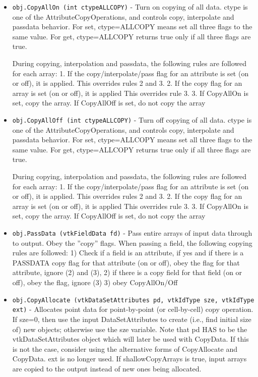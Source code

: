 \begin{itemize}
\item  \verb|obj.CopyAllOn (int ctypeALLCOPY)| -  Turn on copying of all data.
 ctype is one of the AttributeCopyOperations, and controls copy, 
 interpolate and passdata behavior.
 For set, ctype=ALLCOPY means set all three flags to the same value.
 For get, ctype=ALLCOPY returns true only if all three flags are true.

 During copying, interpolation and passdata, the following rules are 
 followed for each array:
 1. If the copy/interpolate/pass flag for an attribute is set (on or off), it is applied.
    This overrides rules 2 and 3.
 2. If the copy flag for an array is set (on or off), it is applied
    This overrides rule 3.
 3. If CopyAllOn is set, copy the array.
    If CopyAllOff is set, do not copy the array

\item  \verb|obj.CopyAllOff (int ctypeALLCOPY)| -  Turn off copying of all data.
 ctype is one of the AttributeCopyOperations, and controls copy, 
 interpolate and passdata behavior.
 For set, ctype=ALLCOPY means set all three flags to the same value.
 For get, ctype=ALLCOPY returns true only if all three flags are true.

 During copying, interpolation and passdata, the following rules are 
 followed for each array:
 1. If the copy/interpolate/pass flag for an attribute is set (on or off), it is applied.
    This overrides rules 2 and 3.
 2. If the copy flag for an array is set (on or off), it is applied
    This overrides rule 3.
 3. If CopyAllOn is set, copy the array.
    If CopyAllOff is set, do not copy the array

\item  \verb|obj.PassData (vtkFieldData fd)| -  Pass entire arrays of input data through to output. Obey the ''copy''
 flags. When passing a field,  the following copying rules are 
 followed: 1) Check if a field is an attribute, if yes and if there
 is a PASSDATA copy flag for that attribute (on or off), obey the flag 
 for that attribute, ignore (2) and (3), 2) if there is a copy field for
 that field (on or off), obey the flag, ignore (3) 3) obey
 CopyAllOn/Off

\item  \verb|obj.CopyAllocate (vtkDataSetAttributes pd, vtkIdType sze, vtkIdType ext)| -  Allocates point data for point-by-point (or cell-by-cell) copy operation.
 If sze=0, then use the input DataSetAttributes to create (i.e., find 
 initial size of) new objects; otherwise use the sze variable.
 Note that pd HAS to be the vtkDataSetAttributes object which
 will later be used with CopyData. If this is not the case,
 consider using the alternative forms of CopyAllocate and CopyData.
 ext is no longer used.
 If shallowCopyArrays is true, input arrays are copied to the output
 instead of new ones being allocated.


\end{itemize}
